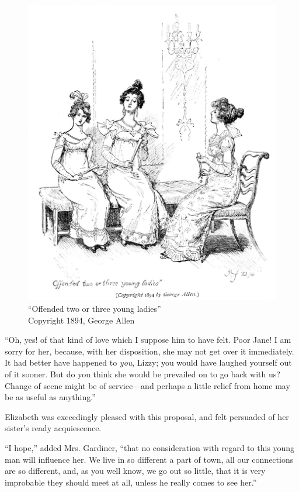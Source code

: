 \begin{figure}[htbp]
    \centering
    \includegraphics[width=\textwidth]{illustrations/i_206.jpg}
    \caption{“Offended two or three young ladies”\\ Copyright 1894, George Allen}
    \label{fig:image}
\end{figure}

``Oh, yes! of that kind of love which I suppose him to have felt. Poor Jane! I am sorry for her, because, with her disposition, she may not get over it immediately. It had better have happened to \textit{you}, Lizzy; you would have laughed yourself out of it sooner. But do you think she would be prevailed on to go back with us? Change of scene might be of service---and perhaps a little relief from home may be as useful as anything.''

Elizabeth was exceedingly pleased with this proposal, and felt persuaded of her sister's ready acquiescence.

``I hope,'' added Mrs. Gardiner, ``that no consideration with regard to this young man will influence her. We live in so different a part of town, all our connections are so different, and, as you well know, we go out so little, that it is very improbable they should meet at all, unless he really comes to see her.''

